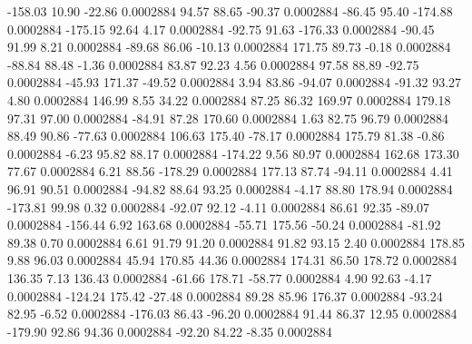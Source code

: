      -158.03       10.90      -22.86     0.0002884
       94.57       88.65      -90.37     0.0002884
      -86.45       95.40     -174.88     0.0002884
     -175.15       92.64        4.17     0.0002884
      -92.75       91.63     -176.33     0.0002884
      -90.45       91.99        8.21     0.0002884
      -89.68       86.06      -10.13     0.0002884
      171.75       89.73       -0.18     0.0002884
      -88.84       88.48       -1.36     0.0002884
       83.87       92.23        4.56     0.0002884
       97.58       88.89      -92.75     0.0002884
      -45.93      171.37      -49.52     0.0002884
        3.94       83.86      -94.07     0.0002884
      -91.32       93.27        4.80     0.0002884
      146.99        8.55       34.22     0.0002884
       87.25       86.32      169.97     0.0002884
      179.18       97.31       97.00     0.0002884
      -84.91       87.28      170.60     0.0002884
        1.63       82.75       96.79     0.0002884
       88.49       90.86      -77.63     0.0002884
      106.63      175.40      -78.17     0.0002884
      175.79       81.38       -0.86     0.0002884
       -6.23       95.82       88.17     0.0002884
     -174.22        9.56       80.97     0.0002884
      162.68      173.30       77.67     0.0002884
        6.21       88.56     -178.29     0.0002884
      177.13       87.74      -94.11     0.0002884
        4.41       96.91       90.51     0.0002884
      -94.82       88.64       93.25     0.0002884
       -4.17       88.80      178.94     0.0002884
     -173.81       99.98        0.32     0.0002884
      -92.07       92.12       -4.11     0.0002884
       86.61       92.35      -89.07     0.0002884
     -156.44        6.92      163.68     0.0002884
      -55.71      175.56      -50.24     0.0002884
      -81.92       89.38        0.70     0.0002884
        6.61       91.79       91.20     0.0002884
       91.82       93.15        2.40     0.0002884
      178.85        9.88       96.03     0.0002884
       45.94      170.85       44.36     0.0002884
      174.31       86.50      178.72     0.0002884
      136.35        7.13      136.43     0.0002884
      -61.66      178.71      -58.77     0.0002884
        4.90       92.63       -4.17     0.0002884
     -124.24      175.42      -27.48     0.0002884
       89.28       85.96      176.37     0.0002884
      -93.24       82.95       -6.52     0.0002884
     -176.03       86.43      -96.20     0.0002884
       91.44       86.37       12.95     0.0002884
     -179.90       92.86       94.36     0.0002884
      -92.20       84.22       -8.35     0.0002884
